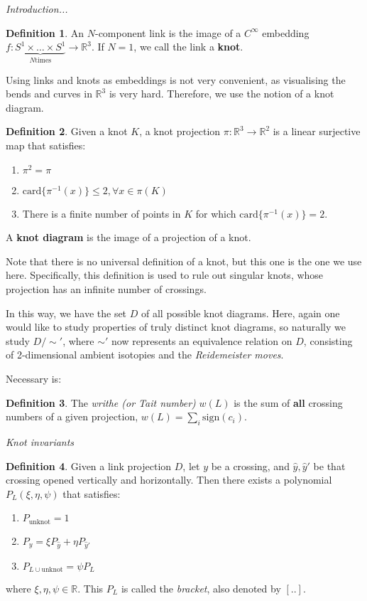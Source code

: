 \documentclass[12pt]{article}
\theoremstyle{definition}
\newtheorem{defn}{Definition}[section]
\begin{document}
\textit{Introduction...}

\begin{defn}
An $N$-component link is the image of a $C^\infty$ embedding $f:\underbrace{S^1 \times\dots\times S^1}_{N \textrm{times}} \rightarrow\mathbb{R}^3$. If $N=1$, we call the link a \textbf{knot}.
\end{defn}

Using links and knots as embeddings is not very convenient, as visualising the bends and curves in $\mathbb{R}^3$ is very hard. Therefore, we use the notion of a knot diagram.

\begin{defn}
Given a knot $K$, a knot projection $\pi:\mathbb{R}^3\rightarrow\mathbb{R}^2$ is a linear surjective map that satisfies:
\begin{enumerate}
\item $\pi^2=\pi$
\item $ \textrm{card}\{\pi^{-1}(x)\} \leq 2, \forall x \in \pi(K)$ 
\item There is a finite number of points in $K$ for which $\textrm{card}\{\pi^{-1}(x)\}=2 $.
\end{enumerate}
A \textbf{knot diagram} is the image of a projection of a knot.
\end{defn}

Note that there is no universal definition of a knot, but this one is the one we use here. Specifically, this definition is used to rule out singular knots, whose projection has an infinite number of crossings.

In this way, we have the set $D$ of all possible knot diagrams. Here, again one would like to study properties of truly distinct knot diagrams, so naturally we study $D/\sim'$, where $\sim'$ now represents an equivalence relation on $D$, consisting of 2-dimensional ambient isotopies and the \textit{Reidemeister moves}.

Necessary is:

\begin{defn}
The \textit{writhe (or Tait number)} $w(L)$ is the sum of \textbf{all} crossing numbers of a given projection, $\displaystyle w(L)=\sum_i\textrm{sign}(c_i)$.
\end{defn}

\textit{Knot invariants}

\begin{defn}\label{conj:2.1}
Given a link projection $D$, let $y$ be a crossing, and $\hat{y}, \hat{y}'$ be that crossing opened vertically and horizontally. Then there exists a polynomial $P_L(\xi,\eta,\psi)$ that satisfies:
\begin{enumerate}
\item $P_\textrm{unknot}=1$
\item $P_y=\xi P_{\hat{y}}+\eta P_{\hat{y}'}$
\item $P_{L\cup \textrm{unknot}}=\psi P_L$
\end{enumerate}
where  $\xi, \eta, \psi \in\mathbb{R}$. This $P_L$ is called the \textit{bracket}, also denoted by $[ .. ]$.
\end{defn}
\end{document}
